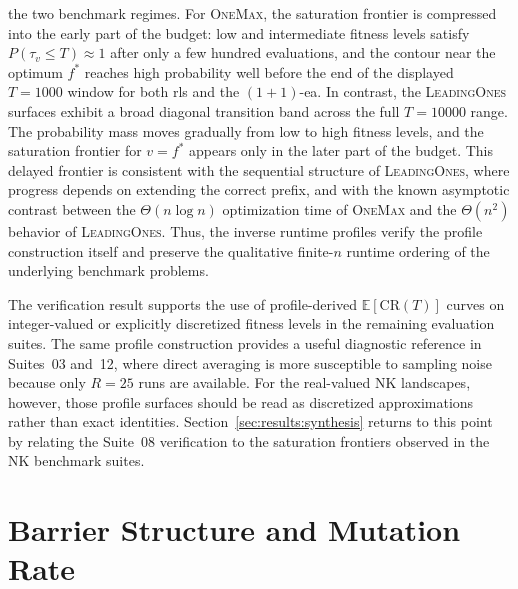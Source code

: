 the two benchmark regimes. For \textsc{OneMax}, the saturation frontier is
compressed into the early part of the budget: low and intermediate fitness
levels satisfy $P(\tau_v \le T) \approx 1$ after only a few hundred
evaluations, and the contour near the optimum $f^\ast$ reaches high
probability well before the end of the displayed $T=1000$ window for both
\acrshort{rls} and the $(1+1)$-\acrshort{ea}. In contrast, the
\textsc{LeadingOnes} surfaces exhibit a broad diagonal transition band
across the full $T=10000$ range. The probability mass moves gradually from
low to high fitness levels, and the saturation frontier for $v=f^\ast$
appears only in the later part of the budget. This delayed frontier is
consistent with the sequential structure of \textsc{LeadingOnes}, where
progress depends on extending the correct prefix, and with the known
asymptotic contrast between the $\Theta(n \log n)$ optimization time of
\textsc{OneMax} and the $\Theta(n^2)$ behavior of
\textsc{LeadingOnes}. Thus, the inverse runtime profiles verify the profile
construction itself and preserve the qualitative finite-$n$ runtime ordering of
the underlying benchmark problems.

The verification result supports the use of profile-derived
$\mathbb{E}[\mathrm{CR}(T)]$ curves on integer-valued or explicitly
discretized fitness levels in the remaining evaluation suites. The same profile
construction provides a useful diagnostic reference in Suites~03 and~12, where
direct averaging is more susceptible to sampling noise because only $R=25$ runs
are available. For the real-valued NK landscapes, however, those profile
surfaces should be read as discretized approximations rather than exact
identities. Section~\ref{sec:results:synthesis} returns to this point by
relating the Suite~08 verification to the saturation frontiers observed in the
NK benchmark suites.
%
\section{Barrier Structure and Mutation Rate}
\label{sec:results:barrier}
